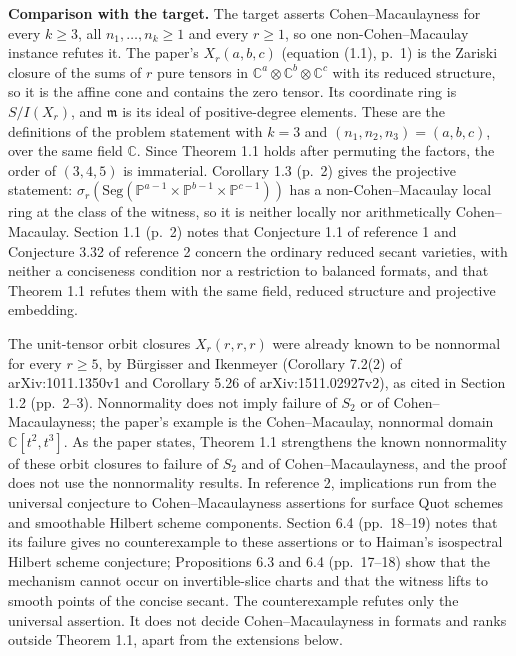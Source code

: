 \documentclass[11pt,a4paper]{article}
\begin{document}
\textbf{Comparison with the target.} The target asserts
Cohen--Macaulayness for every \(k\geq3\), all \(n_1,\ldots,n_k\geq1\)
and every \(r\geq1\), so one non-Cohen--Macaulay instance refutes it.
The paper's \(X_r(a,b,c)\) (equation (1.1), p.~1) is the Zariski closure
of the sums of \(r\) pure tensors in
\(\mathbb C^a\otimes\mathbb C^b\otimes\mathbb C^c\) with its reduced
structure, so it is the affine cone and contains the zero tensor. Its
coordinate ring is \(S/I(X_r)\), and \(\mathfrak m\) is its ideal of
positive-degree elements. These are the definitions of the problem
statement with \(k=3\) and \((n_1,n_2,n_3)=(a,b,c)\), over the same
field \(\mathbb C\). Since Theorem 1.1 holds after permuting the
factors, the order of \((3,4,5)\) is immaterial. Corollary 1.3 (p.~2)
gives the projective statement:
\(\sigma_r(\mathrm{Seg}(\mathbb P^{a-1}\times\mathbb P^{b-1}\times\mathbb P^{c-1}))\)
has a non-Cohen--Macaulay local ring at the class of the witness, so it
is neither locally nor arithmetically Cohen--Macaulay. Section 1.1
(p.~2) notes that Conjecture 1.1 of reference 1 and Conjecture 3.32 of
reference 2 concern the ordinary reduced secant varieties, with neither
a conciseness condition nor a restriction to balanced formats, and that
Theorem 1.1 refutes them with the same field, reduced structure and
projective embedding.

The unit-tensor orbit closures \(X_r(r,r,r)\) were already known to be
nonnormal for every \(r\geq5\), by Bürgisser and Ikenmeyer (Corollary
7.2(2) of arXiv:1011.1350v1 and Corollary 5.26 of arXiv:1511.02927v2),
as cited in Section 1.2 (pp.~2--3). Nonnormality does not imply failure
of \(S_2\) or of Cohen--Macaulayness; the paper's example is the
Cohen--Macaulay, nonnormal domain \(\mathbb C[t^2,t^3]\). As the paper
states, Theorem 1.1 strengthens the known nonnormality of these orbit
closures to failure of \(S_2\) and of Cohen--Macaulayness, and the proof
does not use the nonnormality results. In reference 2, implications run
from the universal conjecture to Cohen--Macaulayness assertions for
surface Quot schemes and smoothable Hilbert scheme components. Section
6.4 (pp.~18--19) notes that its failure gives no counterexample to these
assertions or to Haiman's isospectral Hilbert scheme conjecture;
Propositions 6.3 and 6.4 (pp.~17--18) show that the mechanism cannot
occur on invertible-slice charts and that the witness lifts to smooth
points of the concise secant. The counterexample refutes only the
universal assertion. It does not decide Cohen--Macaulayness in formats
and ranks outside Theorem 1.1, apart from the extensions below.
\end{document}
